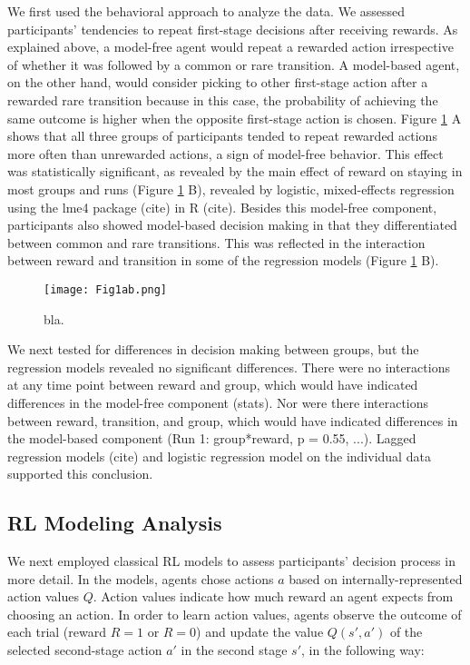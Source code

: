 \documentclass[11pt]{article} %
\begin{document}
We first used the behavioral approach to analyze the data. We assessed participants' tendencies to repeat first-stage decisions after receiving rewards. As explained above, a model-free agent would repeat a rewarded action irrespective of whether it was followed by a common or rare transition. A model-based agent, on the other hand, would consider picking to other first-stage action after a rewarded rare transition because in this case, the probability of achieving the same outcome is higher when the opposite first-stage action is chosen. Figure \ref{Fig1} A shows that all three groups of participants tended to repeat rewarded actions more often than unrewarded actions, a sign of model-free behavior. This effect was statistically significant, as revealed by the main effect of reward on staying in most groups and runs (Figure \ref{Fig1} B), revealed by logistic, mixed-effects regression using the lme4 package (cite) in R (cite). Besides this model-free component, participants also showed model-based decision making in that they differentiated between common and rare transitions. This was reflected in the interaction between reward and transition in some of the regression models (Figure \ref{Fig1} B).

\begin{figure}
	\texttt{[image: Fig1ab.png]}
	\caption{bla.}
	\label{Fig1}
\end{figure}

We next tested for differences in decision making between groups, but the regression models revealed no significant differences. There were no interactions at any time point between reward and group, which would have indicated differences in the model-free component (stats). Nor were there interactions between reward, transition, and group, which would have indicated differences in the model-based component (Run 1: group*reward, p = 0.55, ...). Lagged regression models (cite) and logistic regression model on the individual data supported this conclusion.

\subsection{RL Modeling Analysis}
We next employed classical RL models to assess participants' decision process in more detail. In the models, agents chose actions $a$ based on internally-represented action values $Q$. Action values indicate how much reward an agent expects from choosing an action. In order to learn action values, agents observe the outcome of each trial (reward $R = 1$ or $R = 0$) and update the value $Q(s', a')$ of the selected second-stage action $a'$ in the second stage $s'$, in the following way:
\end{document}
